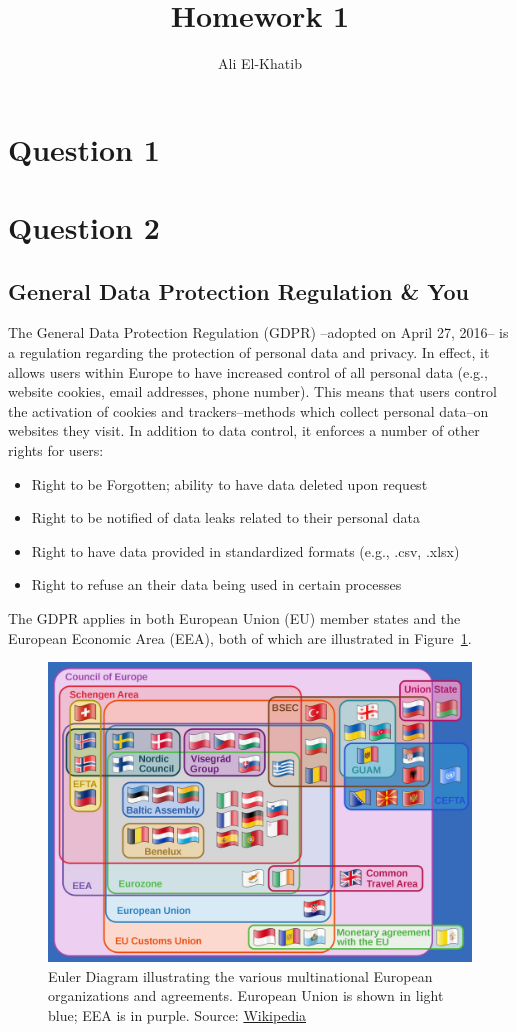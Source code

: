 \documentclass[
	letterpaper, %
]{jdf}
\author{Ali El-Khatib}
\title{Homework 1}
\begin{document}
\maketitle
\section{Question 1}

\section{Question 2}
\subsection{General Data Protection Regulation \& You}
The General Data Protection Regulation (GDPR) --adopted on April 27, 2016-- is a regulation regarding the protection of personal data and privacy. In effect, it allows users within Europe to have increased control of all personal data (e.g., website cookies, email addresses, phone number). This means that users control the activation of cookies and trackers--methods which collect personal data--on websites they visit. In addition to data control, it enforces a number of other rights for users:
\begin{itemize}
	\item Right to be Forgotten; ability to have data deleted upon request
	\item Right to be notified of data leaks related to their personal data
	\item Right to have data provided in standardized formats (e.g., .csv, .xlsx)
	\item Right to refuse an their data being used in certain processes
\end{itemize}


The GDPR applies in both European Union (EU) member states and the European Economic Area (EEA), both of which are illustrated in Figure~\ref{fig:europe-groups}. 
\begin{figure}[H]
	\centering
	\includegraphics[width=0.7\linewidth]{../figures/europe-groups}
	\caption{Euler Diagram illustrating the various multinational European organizations and agreements. European Union is shown in light blue; EEA is in purple. Source: \href{https://en.wikipedia.org/wiki/File:Supranational_European_Bodies-en.svg}{Wikipedia}
	}
	\label{fig:europe-groups}
\end{figure}
\end{document}
